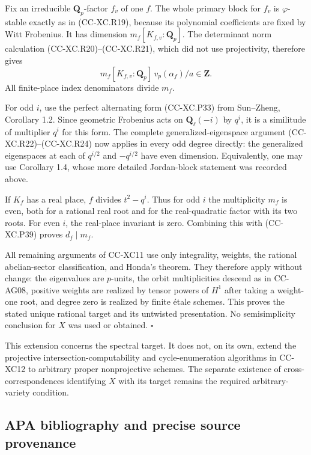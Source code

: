 Fix an irreducible \(\mathbf Q_p\)-factor \(f_v\) of one \(f\). The
whole primary block for \(f_v\) is \(\varphi\)-stable exactly as in
(CC-XC.R19), because its polynomial coefficients are fixed by Witt
Frobenius. It has dimension \(m_f[K_{f,v}:\mathbf Q_p]\). The
determinant norm calculation (CC-XC.R20)--(CC-XC.R21), which did not use
projectivity, therefore gives \[
 m_f[K_{f,v}:\mathbf Q_p]\,
          v_p(\alpha_f)/a\in\mathbf Z.
                                                        \tag{CC-XC.P39}
\] All finite-place index denominators divide \(m_f\).

For odd \(i\), use the perfect alternating form (CC-XC.P33) from
Sun--Zheng, Corollary 1.2. Since geometric Frobenius acts on
\(\mathbf Q_\ell(-i)\) by \(q^i\), it is a similitude of multiplier
\(q^i\) for this form. The complete generalized-eigenspace argument
(CC-XC.R22)--(CC-XC.R24) now applies in every odd degree directly: the
generalized eigenspaces at each of \(q^{i/2}\) and \(-q^{i/2}\) have
even dimension. Equivalently, one may use Corollary 1.4, whose more
detailed Jordan-block statement was recorded above.

If \(K_f\) has a real place, \(f\) divides \(t^2-q^i\). Thus for odd
\(i\) the multiplicity \(m_f\) is even, both for a rational real root
and for the real-quadratic factor with its two roots. For even \(i\),
the real-place invariant is zero. Combining this with (CC-XC.P39) proves
\(d_f\mid m_f\).

All remaining arguments of CC-XC11 use only integrality, weights, the
rational abelian-sector classification, and Honda's theorem. They
therefore apply without change: the eigenvalues are \(p\)-units, the
orbit multiplicities descend as in CC-AG08, positive weights are
realized by tensor powers of \(H^1\) after taking a weight-one root, and
degree zero is realized by finite étale schemes. This proves the stated
unique rational target and its untwisted presentation. No semisimplicity
conclusion for \(X\) was used or obtained. \(\square\)

This extension concerns the spectral target. It does not, on its own,
extend the projective intersection-computability and cycle-enumeration
algorithms in CC-XC12 to arbitrary proper nonprojective schemes. The
separate existence of cross-correspondences identifying \(X\) with its
target remains the required arbitrary-variety condition.

\subsection{APA bibliography and precise source
provenance}\label{apa-bibliography-and-precise-source-provenance}

